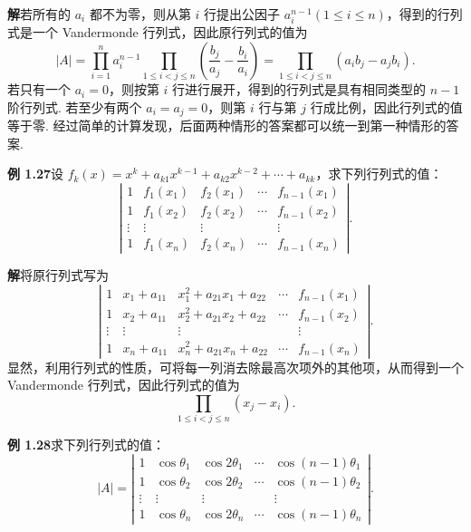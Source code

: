 \documentclass[UTF8, 12pt, fontset=fandol, oneside]{ctexart}
\begin{document}
\noindent\textbf{解}\quad 若所有的 $a_i$ 都不为零，则从第 $i$ 行提出公因子 $a_i^{n-1}(1\le i\le n)$，得到的行列式是一个 Vandermonde 行列式，因此原行列式的值为
\[
|A|=\prod_{i=1}^n a_i^{n-1}\prod_{1\le i<j\le n}\left(\frac{b_j}{a_j}-\frac{b_i}{a_i}\right)
=\prod_{1\le i<j\le n}(a_ib_j-a_jb_i).
\]
若只有一个 $a_i=0$，则按第 $i$ 行进行展开，得到的行列式是具有相同类型的 $n-1$ 阶行列式. 若至少有两个 $a_i=a_j=0$，则第 $i$ 行与第 $j$ 行成比例，因此行列式的值等于零. 经过简单的计算发现，后面两种情形的答案都可以统一到第一种情形的答案.

\noindent\textbf{例 1.27}\quad 设 $f_k(x)=x^k+a_{k1}x^{k-1}+a_{k2}x^{k-2}+\cdots+a_{kk}$，求下列行列式的值：
\[
\left|\begin{array}{ccccc}
1 & f_1(x_1) & f_2(x_1) & \cdots & f_{n-1}(x_1)\\
1 & f_1(x_2) & f_2(x_2) & \cdots & f_{n-1}(x_2)\\
\vdots & \vdots & \vdots &        & \vdots\\
1 & f_1(x_n) & f_2(x_n) & \cdots & f_{n-1}(x_n)
\end{array}\right|.
\]

\noindent\textbf{解}\quad 将原行列式写为
\[
\left|\begin{array}{ccccc}
1 & x_1+a_{11} & x_1^2+a_{21}x_1+a_{22} & \cdots & f_{n-1}(x_1)\\
1 & x_2+a_{11} & x_2^2+a_{21}x_2+a_{22} & \cdots & f_{n-1}(x_2)\\
\vdots & \vdots & \vdots &        & \vdots\\
1 & x_n+a_{11} & x_n^2+a_{21}x_n+a_{22} & \cdots & f_{n-1}(x_n)
\end{array}\right|.
\]
显然，利用行列式的性质，可将每一列消去除最高次项外的其他项，从而得到一个 Vandermonde 行列式，因此行列式的值为
\[
\prod_{1\le i<j\le n}(x_j-x_i).
\]

\noindent\textbf{例 1.28}\quad 求下列行列式的值：
\[
|A|=\left|\begin{array}{ccccc}
1 & \cos\theta_1 & \cos2\theta_1 & \cdots & \cos(n-1)\theta_1\\
1 & \cos\theta_2 & \cos2\theta_2 & \cdots & \cos(n-1)\theta_2\\
\vdots & \vdots & \vdots &        & \vdots\\
1 & \cos\theta_n & \cos2\theta_n & \cdots & \cos(n-1)\theta_n
\end{array}\right|.
\]
\end{document}
